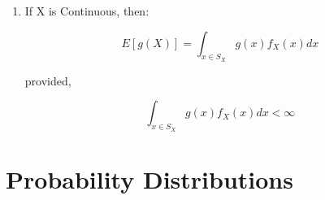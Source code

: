 \documentclass[12pt, a4paper, titlepage]{article}
\begin{document}
\begin{enumerate}
{\begin{enumerate}
	\item{If X is Continuous, then: \begin{center} $$E\left[g(X)\right] = \int_{x \in S_X} g(x) f_X(x) dx $$ \end{center}
			provided,  \begin{center} $$\int_{x \in S_X} g(x) f_X(x) dx< \infty$$ \end{center}
			}
	

\end{enumerate}
	
}


\end{enumerate}

\section{Probability Distributions}


\end{document}
